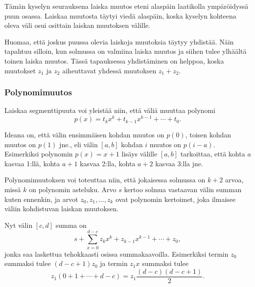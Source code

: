 \begin{center}
\end{center}
Tämän kyselyn seurauksena laiska muutos eteni alaspäin
laatikolla ympäröidyssä puun osassa.
Laiskaa muutosta täytyi viedä alaspäin, koska kyselyn
kohteena oleva väli osui osittain laiskan muutoksen välille.

Huomaa, että joskus puussa olevia laiskoja muutoksia täytyy yhdistää.
Näin tapahtuu silloin, kun solmussa on valmiina laiska muutos
ja siihen tulee ylhäältä toinen laiska muutos.
Tässä tapauksessa yhdistäminen on helppoa,
koska muutokset $z_1$ ja $z_2$ aiheuttavat yhdessä muutoksen $z_1+z_2$.

\subsubsection{Polynomimuutos}

Laiskaa segmenttipuuta voi yleistää niin,
että väliä muuttaa polynomi
\[p(x) = t_k x^k + t_{k-1} x^{k-1} + \cdots + t_0.\]

Ideana on, että välin ensimmäisen kohdan
muutos on $p(0)$, toisen kohdan muutos on $p(1)$ jne.,
eli välin $[a,b]$ kohdan $i$ muutos on $p(i-a)$.
Esimerkiksi polynomin $p(x)=x+1$ lisäys välille
$[a,b]$ tarkoittaa, että kohta $a$ kasvaa 1:llä,
kohta $a+1$ kasvaa 2:lla, kohta $a+2$ kasvaa 3:lla jne.

Polynomimuutoksen voi toteuttaa niin,
että jokaisessa solmussa on $k+2$ arvoa,
missä $k$ on polynomin asteluku.
Arvo $s$ kertoo solmua vastaavan välin summan kuten ennenkin,
ja arvot $z_0,z_1,\ldots,z_k$ ovat polynomin kertoimet,
joka ilmaisee väliin kohdistuvan laiskan muutoksen.

Nyt välin $[c,d]$ summa on
\[s+\sum_{x=0}^{d-c} z_k x^k + z_{k-1} x^{k-1} + \cdots + z_0,\]
jonka saa laskettua tehokkaasti osissa summakaavoilla.
Esimerkiksi termin $z_0$ summaksi tulee
$(d-c+1)z_0$ ja termin $z_1 x$ summaksi tulee
\[z_1(0+1+\cdots+d-c) = z_1 \frac{(d-c)(d-c+1)}{2} .\]

